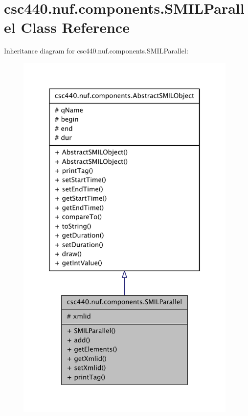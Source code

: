 \hypertarget{classcsc440_1_1nuf_1_1components_1_1_s_m_i_l_parallel}{\section{csc440.\-nuf.\-components.\-S\-M\-I\-L\-Parallel Class Reference}
\label{classcsc440_1_1nuf_1_1components_1_1_s_m_i_l_parallel}
}


Inheritance diagram for csc440.\-nuf.\-components.\-S\-M\-I\-L\-Parallel\-:
\nopagebreak
\begin{figure}[H]
\begin{center}
\leavevmode
\includegraphics[width=310pt]{classcsc440_1_1nuf_1_1components_1_1_s_m_i_l_parallel__inherit__graph}
\end{center}
\end{figure}


